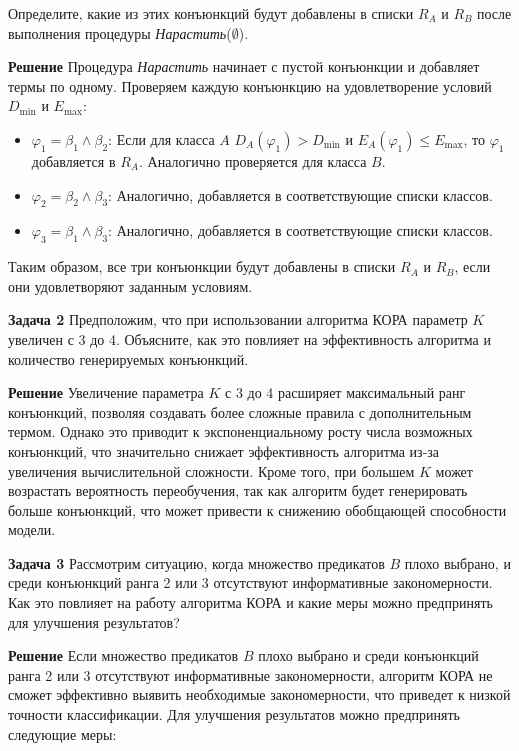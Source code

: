 Определите, какие из этих конъюнкций будут добавлены в списки \( R_A \) и \( R_B \) после выполнения процедуры \textit{Нарастить}(\(\emptyset\)).

\textbf{Решение}
Процедура \textit{Нарастить} начинает с пустой конъюнкции и добавляет термы по одному. Проверяем каждую конъюнкцию на удовлетворение условий \( D_{\text{min}} \) и \( E_{\text{max}} \):

\begin{itemize}
    \item \(\varphi_1 = \beta_1 \wedge \beta_2\): Если для класса \(A\) \(D_A(\varphi_1) > D_{\text{min}}\) и \(E_A(\varphi_1) \leq E_{\text{max}}\), то \(\varphi_1\) добавляется в \( R_A \). Аналогично проверяется для класса \(B\).
    \item \(\varphi_2 = \beta_2 \wedge \beta_3\): Аналогично, добавляется в соответствующие списки классов.
    \item \(\varphi_3 = \beta_1 \wedge \beta_3\): Аналогично, добавляется в соответствующие списки классов.
\end{itemize}

Таким образом, все три конъюнкции будут добавлены в списки \( R_A \) и \( R_B \), если они удовлетворяют заданным условиям.

\textbf{Задача 2}
Предположим, что при использовании алгоритма КОРА параметр \( K \) увеличен с 3 до 4. Объясните, как это повлияет на эффективность алгоритма и количество генерируемых конъюнкций.

\textbf{Решение}
Увеличение параметра \( K \) с 3 до 4 расширяет максимальный ранг конъюнкций, позволяя создавать более сложные правила с дополнительным термом. Однако это приводит к экспоненциальному росту числа возможных конъюнкций, что значительно снижает эффективность алгоритма из-за увеличения вычислительной сложности. Кроме того, при большем \( K \) может возрастать вероятность переобучения, так как алгоритм будет генерировать больше конъюнкций, что может привести к снижению обобщающей способности модели.

\textbf{Задача 3}
Рассмотрим ситуацию, когда множество предикатов \( B \) плохо выбрано, и среди конъюнкций ранга 2 или 3 отсутствуют информативные закономерности. Как это повлияет на работу алгоритма КОРА и какие меры можно предпринять для улучшения результатов?

\textbf{Решение}
Если множество предикатов \( B \) плохо выбрано и среди конъюнкций ранга 2 или 3 отсутствуют информативные закономерности, алгоритм КОРА не сможет эффективно выявить необходимые закономерности, что приведет к низкой точности классификации. Для улучшения результатов можно предпринять следующие меры:

